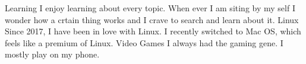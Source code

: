 



\begin{cvskills}

    \cvskill
    {Learning} %
    {I enjoy learning about every topic. When ever I am siting by my self I wonder how a crtain thing works and I crave to search and learn about it.} %
  \cvskill
    {Linux} %
    {Since 2017, I have been in love with Linux. I recently switched to Mac OS, which feels like a premium of Linux.} %
  \cvskill
    {Video Games} %
    {I always had the gaming gene. I mostly play on my phone.} %

\end{cvskills}